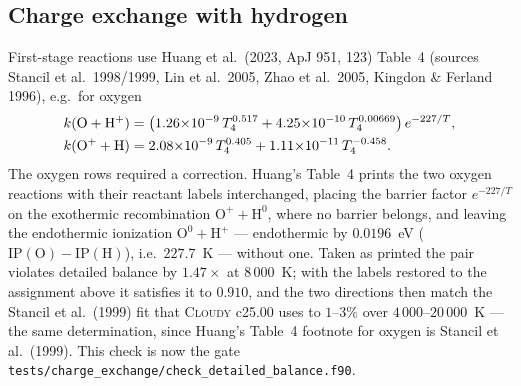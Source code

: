 \documentclass[english,a4paper]{my_memo}
\newcommand{\code}[1]{\texttt{#1}}
\begin{document}
\subsection{Charge exchange with hydrogen}
\label{sec:cx}
First-stage reactions use Huang et al.\
(2023, ApJ 951, 123) Table~4 (sources Stancil et al.\ 1998/1999, Lin et
al.\ 2005, Zhao et al.\ 2005, Kingdon \& Ferland 1996), e.g.\ for oxygen
\begin{align}
  k({\rm O} + {\rm H}^+) &= \big(1.26{\times}10^{-9}\,T_4^{0.517}
   + 4.25{\times}10^{-10}\,T_4^{0.00669}\big)\,e^{-227/T},\nonumber\\
  k({\rm O}^+ + {\rm H}) &= 2.08{\times}10^{-9}\,T_4^{0.405}
   + 1.11{\times}10^{-11}\,T_4^{-0.458}.
\end{align}
The oxygen rows required a correction.  Huang's Table~4 prints the two
oxygen reactions with their reactant labels interchanged, placing the
barrier factor $e^{-227/T}$ on the exothermic recombination
$\mathrm{O}^+ + \mathrm{H}^0$, where no barrier belongs, and leaving the
endothermic ionization $\mathrm{O}^0 + \mathrm{H}^+$ --- endothermic by
$0.0196$~eV ($\mathrm{IP(O)}-\mathrm{IP(H)}$), i.e.\ $227.7$~K --- without
one.  Taken as printed the pair violates detailed balance by $1.47\times$
at $8\,000$~K; with the labels restored to the assignment above it
satisfies it to $0.910$, and the two directions then match the Stancil et
al.\ (1999) fit that \textsc{Cloudy} c25.00 uses to $1$--$3\%$ over
$4\,000$--$20\,000$~K --- the same determination, since Huang's Table~4
footnote for oxygen is Stancil et al.\ (1999).  This check is now the gate
\code{tests/charge\_exchange/check\_detailed\_balance.f90}.
\end{document}
